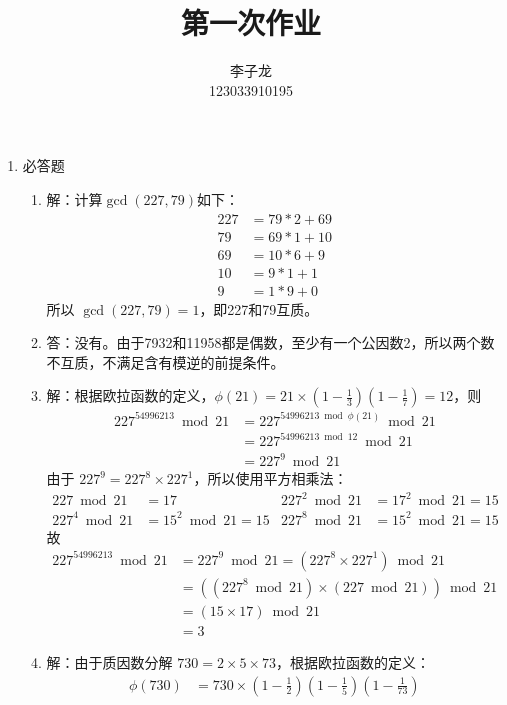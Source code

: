 \documentclass{sjtuarticle}
\title{第一次作业}
\author{李子龙\\123033910195}
\begin{document}
\maketitle
\begin{enumerate}
    \item 必答题
    \begin{enumerate}
        \item 解：计算$\gcd (227,79)$如下：
        \begin{align*}
            227&=79*2+69\\
            79&=69*1+10\\
            69&=10*6+9\\
            10&=9*1+1\\
            9&=1*9+0
        \end{align*}
        所以 $\gcd(227,79)=1$，即227和79互质。
        \item 答：没有。由于7932和11958都是偶数，至少有一个公因数2，所以两个数不互质，不满足含有模逆的前提条件。
        \item 解：根据欧拉函数的定义，$\phi(21)=21\times\left(1-\frac{1}{3}\right)\left(1-\frac{1}{7}\right)=12$，则
        \begin{align*}
            227^{54996213} \bmod 21 &= 227^{54996213\bmod \phi(21)} \bmod 21\\ 
            &= 227^{54996213\bmod 12} \bmod 21 \\
            &= 227^{9} \bmod 21
        \end{align*}
        由于 $227^{9}=227^8\times 227^1$，所以使用平方相乘法：
        \begin{align*}
            227\bmod 21 &= 17 & 227^2\bmod 21 &= 17^2\bmod 21 = 15 \\
            227^4\bmod 21 &= 15^2 \bmod 21 = 15 & 227^8\bmod 21 &= 15^2 \bmod 21 = 15
        \end{align*}
        故
        \begin{align*}
            227^{54996213} \bmod 21 &= 227^{9} \bmod 21 = (227^8\times 227^1 ) \bmod 21 \\
            &= ((227^8 \bmod 21) \times (227 \bmod 21))\bmod 21\\
            &= (15\times 17)\bmod 21 \\
            &= 3
        \end{align*}
        \item 解：由于质因数分解 $730=2\times 5\times 73$，根据欧拉函数的定义：
        \begin{align*}
            \phi(730) &= 730\times \left(1-\frac{1}{2}\right)\left(1-\frac{1}{5}\right)\left(1-\frac{1}{73}\right)\\

\end{align*}
\end{enumerate}
\end{enumerate}
\end{document}
